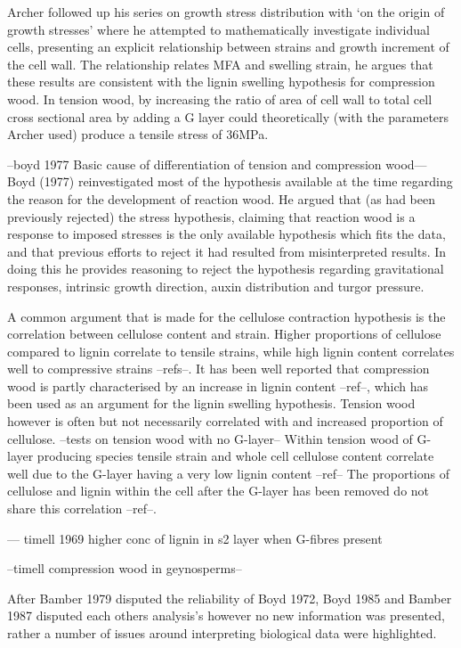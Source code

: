\documentclass{article}
\begin{document}
Archer followed up his series on growth stress distribution with `on the origin
of growth stresses' where he attempted to mathematically investigate individual
cells, presenting an explicit relationship between strains and growth
increment of the cell wall. The relationship relates MFA and swelling strain,
he argues that these results are consistent with the lignin swelling hypothesis
for compression wood. In tension wood, by increasing the ratio of area of cell
wall to total cell cross sectional area by adding a G layer could theoretically
(with the parameters Archer used) produce a tensile stress of 36MPa.

 --boyd 1977 Basic cause of differentiation of tension and
compression wood--- Boyd (1977) reinvestigated most of the hypothesis available at the time
regarding the reason for the development of reaction wood. He argued that (as
had been previously rejected) the stress hypothesis, claiming that reaction wood
is a response to imposed stresses is the only available hypothesis which fits
the data, and that previous efforts to reject it had resulted from
misinterpreted results. In doing this he provides reasoning to reject the
hypothesis regarding gravitational responses, intrinsic growth direction, auxin
distribution and turgor pressure.

A common argument that is made for the cellulose contraction hypothesis is the
correlation between cellulose content and strain. Higher proportions of
cellulose compared to lignin correlate to tensile strains, while high lignin
content correlates well to compressive strains --refs--. It has been well
reported that compression wood is partly characterised by an increase in
lignin content --ref--, which has been used as an argument for the lignin
swelling hypothesis. Tension wood however is often but not necessarily
correlated with and increased proportion of cellulose. --tests on tension wood
with no G-layer-- Within tension wood of G-layer producing species tensile
strain and whole cell cellulose content correlate well due to the G-layer
having a very low lignin content --ref-- The proportions of cellulose and lignin
within the cell after the G-layer has been removed do not share this correlation
--ref--.

--- timell 1969 higher conc of lignin in s2 layer when G-fibres present

--timell compression wood in geynosperms--


After Bamber 1979 disputed the reliability of Boyd 1972, Boyd 1985 and Bamber
1987 disputed each others analysis's however no new information was presented,
rather a number of issues around interpreting biological data were highlighted.
\end{document}
